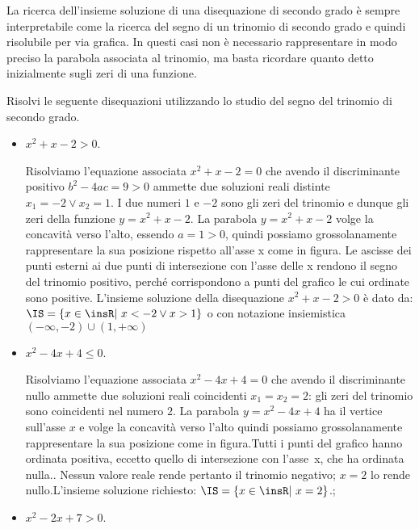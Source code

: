 \osservazione La ricerca dell'insieme soluzione di una disequazione di secondo 
grado è sempre interpretabile come la ricerca del segno di un trinomio di 
secondo grado e quindi risolubile per via grafica. In questi casi non è 
necessario rappresentare in modo preciso la parabola associata al trinomio, ma 
basta ricordare quanto detto inizialmente sugli zeri di una funzione.

\begin{esempio}
Risolvi le seguente disequazioni utilizzando lo studio del segno del trinomio 
di secondo grado.



\begin{itemize}
\item $x^2+x-2>0$.

Risolviamo l'equazione associata $x^2+x-2=0$ che avendo il discriminante 
positivo $b^2-4ac=9>0$ ammette due soluzioni reali distinte $x_1=-2\vee x_2=1$. 
I due numeri $1$ e $-2$ sono gli zeri del trinomio e dunque gli zeri della 
funzione $y=x^2+x-2$. La parabola $y=x^2+x-2$ volge la concavità verso l'alto, 
essendo $a=1>0$, quindi possiamo grossolanamente rappresentare la sua 
posizione rispetto all'asse x come in figura.
Le ascisse dei punti esterni ai due punti di intersezione con l'asse delle x 
rendono il segno del trinomio positivo, perché corrispondono a punti del 
grafico 
le cui ordinate sono positive.  L'insieme soluzione della disequazione 
$x^2+x-2>0$ è dato da: $\IS=\{x\in \insR\text{{\textbar} }x<-2\vee x>1\}$ o con 
notazione insiemistica $(-\infty,-2)\cup (1,+\infty )$

\item $x^2-4x+4\le 0$.

Risolviamo l'equazione associata $x^2-4x+4=0$ che avendo il discriminante nullo 
ammette due soluzioni reali coincidenti $x_1=x_2=2$: gli zeri del trinomio sono 
coincidenti nel numero $2$. La parabola $y=x^2-4x+4$ ha il vertice sull'asse 
$x$ 
e volge la concavità verso l'alto quindi possiamo grossolanamente rappresentare 
la sua posizione come in figura.Tutti i punti del grafico hanno ordinata 
positiva, eccetto 
quello di intersezione con l'asse~x, che ha ordinata nulla.. Nessun valore 
reale rende pertanto il trinomio negativo; $x=2$ lo rende nullo.L'insieme 
soluzione richiesto: $\IS=\{x\in \insR\text{{\textbar} }x=2\}$.;

\item $x^2-2x+7>0$.


\end{itemize}
\end{esempio}
